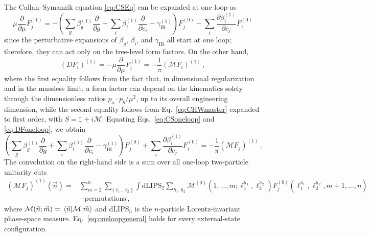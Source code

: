 The Callan--Symanzik equation \eqref{eq:CSEq}
can be expanded at one loop as
\begin{equation}
    \label{eq:CSoneloop}
    \mu\frac{\partial}{\partial \mu} F_j^{(1)} = -\left(\sum_g\beta_g^{(1)} \frac{\partial}{\partial g} + \sum_i \beta_i^{(1)} \frac{\partial}{\partial c_i}- \gamma_{\text{IR}}^{(1)}\right)F_j^{(0)} - \sum_i \frac{\partial \beta_i^{(1)}}{\partial c_j} F_i^{(0)}
\end{equation}
since the perturbative expansions of $\beta_g$, $\beta_i$, and $\gamma_{\text{IR}}$ all start at one loop; therefore, they can act only on the tree-level form factors.
On the other hand, 
\begin{equation}\label{eq:DFoneloop}
    (D F_i)^{(1)} = -\mu\frac{\partial}{\partial \mu} F_i^{(1)} = -\frac{1}{\pi}(\mathcal M F_i)^{(1)}\,,
\end{equation}
where the first equality follows from the fact that, in dimensional regularization and in the massless limit, a form factor can depend on the kinematics solely through the dimensionless ratios $p_a\cdot p_b/\mu^2$, up to its overall engineering dimension, while the second equality follows from Eq.~\eqref{eq:CHWmaster} expanded to first order, with $S=\mathbb{1}+i\mathcal M$.
Equating Eqs.~\eqref{eq:CSoneloop} and \eqref{eq:DFoneloop}, we obtain
\begin{equation}\label{eq:oneloopgeneral}
    \left(\sum_g\beta_g^{(1)} \frac{\partial}{\partial g} + \sum_i \beta_i^{(1)} \frac{\partial}{\partial c_i}- \gamma_{\text{IR}}^{(1)}\right)F_j^{(0)} + \sum_i \frac{\partial \beta_i^{(1)}}{\partial c_j} F_i^{(0)} = -\frac{1}{\pi}(\mathcal M F_j)^{(1)}\,.
\end{equation}
The convolution on the right-hand side is a sum over all one-loop two-particle unitarity cuts
\begin{align}\label{eq:oneloopcut}
    (\mathcal M F_j)^{(1)}(\vec n) =
    &\sum_{m=2}^{n}\sum_{\{\ell_1,\ell_2\}}\int \text{dLIPS}_2
    \sum_{h_1,h_2} \mathcal M^{(0)}(1,\dotsc,m;\ell_1^{h_1},\ell_2^{h_2}) F_j^{(0)}(\ell_1^{h_1},\ell_2^{h_2},m+1,\dotsc,n)\nonumber \\&+\text{permutations}\,,
\end{align}
where $\mathcal M(\vec n;\vec m) = \mel{\vec n}{\mathcal M}{\vec m}$ and $\text{dLIPS}_n$ is the $n$-particle Lorentz-invariant phase-space measure.
Eq.~\eqref{eq:oneloopgeneral} holds for every external-state configuration.

